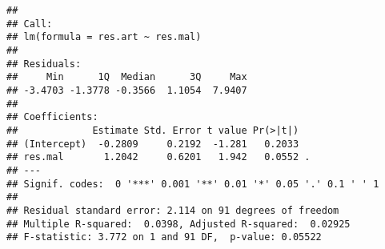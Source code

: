 \documentclass[]{article}
\newenvironment{Shaded}{\begin{snugshade}}{\end{snugshade}}
\newcommand{\KeywordTok}[1]{\textcolor[rgb]{0.13,0.29,0.53}{\textbf{#1}}}
\newcommand{\DataTypeTok}[1]{\textcolor[rgb]{0.13,0.29,0.53}{#1}}
\newcommand{\DecValTok}[1]{\textcolor[rgb]{0.00,0.00,0.81}{#1}}
\newcommand{\StringTok}[1]{\textcolor[rgb]{0.31,0.60,0.02}{#1}}
\newcommand{\OtherTok}[1]{\textcolor[rgb]{0.56,0.35,0.01}{#1}}
\newcommand{\OperatorTok}[1]{\textcolor[rgb]{0.81,0.36,0.00}{\textbf{#1}}}
\newcommand{\NormalTok}[1]{#1}
\begin{document}
\begin{verbatim}
## 
## Call:
## lm(formula = res.art ~ res.mal)
## 
## Residuals:
##     Min      1Q  Median      3Q     Max 
## -3.4703 -1.3778 -0.3566  1.1054  7.9407 
## 
## Coefficients:
##             Estimate Std. Error t value Pr(>|t|)  
## (Intercept)  -0.2809     0.2192  -1.281   0.2033  
## res.mal       1.2042     0.6201   1.942   0.0552 .
## ---
## Signif. codes:  0 '***' 0.001 '**' 0.01 '*' 0.05 '.' 0.1 ' ' 1
## 
## Residual standard error: 2.114 on 91 degrees of freedom
## Multiple R-squared:  0.0398, Adjusted R-squared:  0.02925 
## F-statistic: 3.772 on 1 and 91 DF,  p-value: 0.05522
\end{verbatim}

\begin{Shaded}
\end{Shaded}
\end{document}
